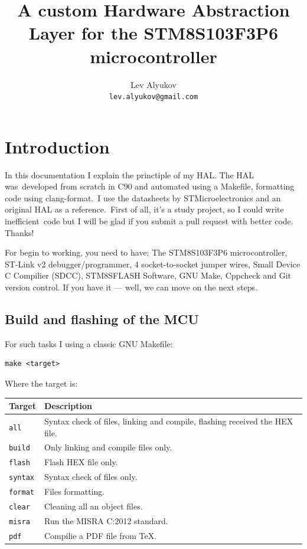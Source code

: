 \documentclass[12pt, a4paper]{article}
\title{A custom Hardware Abstraction Layer for the STM8S103F3P6 microcontroller}
\author{Lev Alyukov \\ \texttt{lev.alyukov@gmail.com}}
\date{}
\begin{document}
\maketitle

\section{Introduction}

In this documentation I explain the princtiple of my HAL. The HAL was\
developed from scratch in C90 and automated using a Makefile, formatting code using clang-format.\
I use the datasheets by STMicroelectronics and an original HAL as a reference.\
First of all, it's a study project, so I could write inefficient\
code but I will be glad if you submit a pull request with better code. Thanks!

For begin to working, you need to have: The STM8S103F3P6 microcontroller, ST-Link v2 debugger/programmer, 4 socket-to-socket jumper wires, Small Device C Compilier (SDCC), STM8SFLASH Software, GNU Make, Cppcheck and Git version control. If you have it --- well, we can move on the next steps.

\newpage

\subsection{Build and flashing of the MCU}

For such tasks I using a classic GNU Makefile:

\begin{lstlisting}
make <target>
\end{lstlisting}

Where the target is:

\begin{center}
  \begin{tabular}{|l|l|}
    \hline
    Target & Description\\
    \hline
    \texttt{all} & Syntax check of files, linking and compile, flashing received the HEX file.\\
    \hline
    \texttt{build} & Only linking and compile files only.\\
    \hline
    \texttt{flash} & Flash HEX file only.\\
    \hline
    \texttt{syntax} & Syntax check of files only.\\
    \hline
    \texttt{format} & Files formatting.\\
    \hline
    \texttt{clear} & Cleaning all an object files.\\
    \hline
    \texttt{misra} & Run the MISRA C:2012 standard.\\
    \hline
    \texttt{pdf} & Compilie a PDF file from TeX.\\
    \hline
  \end{tabular}
\end{center}
\end{document}
